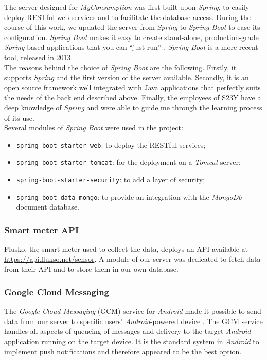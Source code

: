 \documentclass[a4paper, oneside, 11pt]{book}
\begin{document}
The server designed for \textit{MyConsumption} was first built upon \textit{Spring}, to easily deploy RESTful web services and to facilitate the database access. During the course of this work, we updated the server from \textit{Spring} to \textit{Spring Boot} to ease its configuration. \textit{Spring Boot} makes it easy to create stand-alone, production-grade \textit{Spring} based applications that you can “just run” \cite{Springboot:online}. \textit{Spring Boot} is a more recent tool, released in 2013.\\

The reasons behind the choice of \textit{Spring Boot} are the following. Firstly, it supports \textit{Spring} and the first version of the server available. Secondly, it is an open source framework well integrated with Java applications that perfectly suits the needs of the back end described above. Finally, the employees of S23Y have a deep knowledge of \textit{Spring} and were able to guide me through the learning process of its use. \\
Several modules of \textit{Spring Boot} were used in the project:
\begin{itemize}
	\item \texttt{spring-boot-starter-web}: to deploy the RESTful services;
	\item \texttt{spring-boot-starter-tomcat}: for the deployment on a \textit{Tomcat} server;
	\item \texttt{spring-boot-starter-security}: to add a layer of security;
	\item \texttt{spring-boot-data-mongo}: to provide an integration with the \textit{MongoDb} document database.
\end{itemize}

\subsubsection{Smart meter API}
Flusko, the smart meter used to collect the data, deploys an API available at \url{https://api.flukso.net/sensor}. A module of our server was dedicated to fetch data from their API and to store them in our own database.

\subsubsection{Google Cloud Messaging}
The \textit{Google Cloud Messaging} (GCM) service for \textit{Android} made it possible to send data from our server to specific users’ \textit{Android}-powered device \cite{googlecloudmsg:online}. The GCM service handles all aspects of queueing of messages and delivery to the target \textit{Android} application running on the target device. It is the standard system in \textit{Android} to implement push notifications and therefore  appeared to be the best option.
\end{document}
